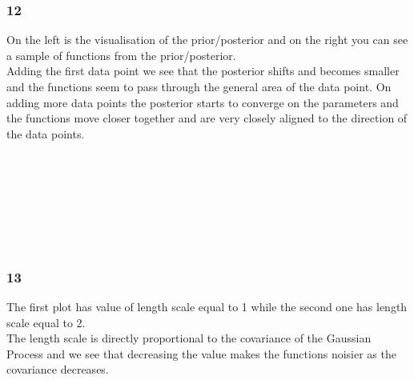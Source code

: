 \documentclass[11pt]{article}
\begin{document}
    \subsubsection*{12}\label{section}

On the left is the visualisation of the prior/posterior and on the right
you can see a sample of functions from the prior/posterior.\\
Adding the first data point we see that the posterior shifts and becomes
smaller and the functions seem to pass through the general area of the
data point. On adding more data points the posterior starts to converge
on the parameters and the functions move closer together and are very
closely aligned to the direction of the data points.
    \begin{center}
    \end{center}
    { \hspace*{\fill} \\}
    \begin{center}
    \end{center}
    { \hspace*{\fill} \\}

    \begin{center}
    \end{center}
    { \hspace*{\fill} \\}

    \begin{center}
    \end{center}
    { \hspace*{\fill} \\}

    \subsubsection*{13}\label{section}

The first plot has value of length scale equal to 1 while the second one
has length scale equal to 2.\\
The length scale is directly proportional to the covariance of the
Gaussian Process and we see that decreasing the value makes the
functions noisier as the covariance decreases.
\end{document}
